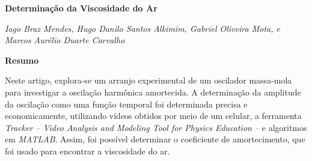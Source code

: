 \documentclass[a4paper, 12pt]{article}
\begin{document}
	\begin{center}
	\begin{large}
		\textbf{Determinação da Viscosidade do Ar}	
	\end{large}
	\end{center}
	
	\begin{center}
		\textit{Iago Braz Mendes, Hugo Danilo Santos Alkimim, Gabriel Oliveira Mota, e Marcos Aurélio Duarte Carvalho}
	\end{center}

	\textbf{Resumo}
		\setlength{\parindent}{4ex}
		\par Neste artigo, explora-se um arranjo experimental de um oscilador massa-mola para investigar a oscilação harmônica amortecida. A determinação da amplitude da oscilação como uma função temporal foi determinada precisa e economicamente, utilizando vídeos obtidos por meio de um celular, a ferramenta \textit{Tracker -- Video Analysis and Modeling Tool for Physics Education --} e algoritmos em \textit{MATLAB}. Assim, foi possível determinar o coeficiente de amortecimento, que foi usado para encontrar a viscosidade do ar.
	
\end{document}
